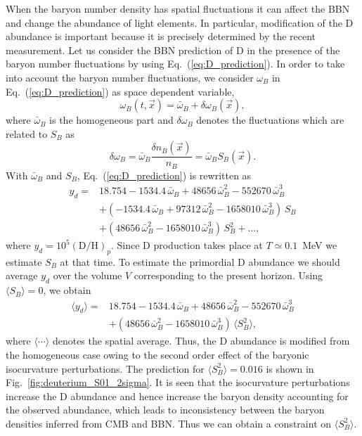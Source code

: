 \documentclass[11pt,a4paper]{article}
\begin{document}
When the baryon number density has spatial fluctuations it can affect the BBN and change the abundance of light elements.
In particular, modification of the D abundance is important because it is precisely determined by the recent measurement.
Let us consider the BBN prediction of D in the presence of the baryon number fluctuations by using Eq.~(\ref{eq:D_prediction}).
In order to take into account the baryon number fluctuations, we consider $\omega_B$  in Eq.~(\ref{eq:D_prediction}) as space dependent variable,
\begin{equation}
    \omega_B(t,\vec{x}) = \bar{\omega}_B + \delta\omega_B(\vec{x}),
\end{equation}
where $\bar{\omega}_B$ is the homogeneous part and $\delta\omega_B$ denotes the fluctuations which are related to $S_B$ as
\begin{equation}
    \delta\omega_B = \bar{\omega}_B \frac{\delta n_B(\vec{x})}{n_B}
    =\bar{\omega}_B S_B(\vec{x}).
\end{equation}
With $\bar{\omega}_B$ and $S_B$, Eq.~(\ref{eq:D_prediction}) is rewritten as
\begin{align}
    y_d = & 18.754-1534.4\,\bar{\omega}_B + 
         48656\,\bar{\omega}_B^2
           -552670\,\bar{\omega}_B^3 \nonumber \\
         & + (-1534.4 \,\bar{\omega}_B  + 97312\,\bar{\omega}_B ^2
           - 1658010\,\bar{\omega}_B^3)\,S_B \nonumber \\
         & +(48656\,\bar{\omega}_B ^2 - 1658010\,\bar{\omega}_B ^3)\,S_B^2
           +\ldots,
\end{align}
where $y_d = 10^5(\text{D}/\text{H})_p$.
Since D production takes place at $T\simeq 0.1$~MeV we estimate $S_B$ at that time.
To estimate the primordial D abundance we should average $y_d$ over the volume $V$ corresponding to the present horizon.
Using $\langle S_B\rangle =0$, we obtain
\begin{align}
    \langle y_d \rangle = & 18.754-1534.4\,\bar{\omega}_B 
    + 48656\,\bar{\omega}_B^2
           -552670\,\bar{\omega}_B^3 \nonumber \\
         & +(48656\,\bar{\omega}_B ^2 - 1658010\,\bar{\omega}_B ^3)\,
           \langle S_B^2\rangle,
\label{eq:yd_formula_ave}           
\end{align}
where $\langle \cdots \rangle$ denotes the spatial average.
Thus, the D abundance is modified from the homogeneous case owing to the second order effect of the baryonic isocurvature perturbations.
The prediction for $\langle S_B^2 \rangle = 0.016$ is shown in Fig.~\ref{fig:deuterium_S01_2sigma}.
It is seen that the isocurvature perturbations increase the D abundance and hence increase the baryon density accounting for the observed abundance, which leads to inconsistency between the baryon densities inferred from CMB and BBN.
Thus we can obtain a constraint on $\langle S_B^2 \rangle$.
\end{document}

